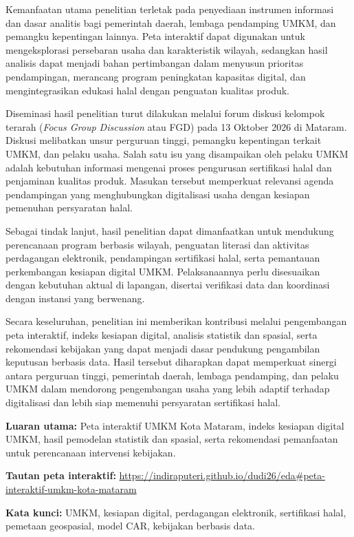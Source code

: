 \documentclass[
  indonesian,
  11pt,
  a4paper,
]{report}
\begin{document}
Kemanfaatan utama penelitian terletak pada penyediaan instrumen
informasi dan dasar analitis bagi pemerintah daerah, lembaga pendamping
UMKM, dan pemangku kepentingan lainnya. Peta interaktif dapat digunakan
untuk mengeksplorasi persebaran usaha dan karakteristik wilayah,
sedangkan hasil analisis dapat menjadi bahan pertimbangan dalam menyusun
prioritas pendampingan, merancang program peningkatan kapasitas digital,
dan mengintegrasikan edukasi halal dengan penguatan kualitas produk.

Diseminasi hasil penelitian turut dilakukan melalui forum diskusi
kelompok terarah (\emph{Focus Group Discussion} atau FGD) pada 13
Oktober 2026 di Mataram. Diskusi melibatkan unsur perguruan tinggi,
pemangku kepentingan terkait UMKM, dan pelaku usaha. Salah satu isu yang
disampaikan oleh pelaku UMKM adalah kebutuhan informasi mengenai proses
pengurusan sertifikasi halal dan penjaminan kualitas produk. Masukan
tersebut memperkuat relevansi agenda pendampingan yang menghubungkan
digitalisasi usaha dengan kesiapan pemenuhan persyaratan halal.

Sebagai tindak lanjut, hasil penelitian dapat dimanfaatkan untuk
mendukung perencanaan program berbasis wilayah, penguatan literasi dan
aktivitas perdagangan elektronik, pendampingan sertifikasi halal, serta
pemantauan perkembangan kesiapan digital UMKM. Pelaksanaannya perlu
disesuaikan dengan kebutuhan aktual di lapangan, disertai verifikasi
data dan koordinasi dengan instansi yang berwenang.

Secara keseluruhan, penelitian ini memberikan kontribusi melalui
pengembangan peta interaktif, indeks kesiapan digital, analisis
statistik dan spasial, serta rekomendasi kebijakan yang dapat menjadi
dasar pendukung pengambilan keputusan berbasis data. Hasil tersebut
diharapkan dapat memperkuat sinergi antara perguruan tinggi, pemerintah
daerah, lembaga pendamping, dan pelaku UMKM dalam mendorong pengembangan
usaha yang lebih adaptif terhadap digitalisasi dan lebih siap memenuhi
persyaratan sertifikasi halal.

\textbf{Luaran utama:} Peta interaktif UMKM Kota Mataram, indeks
kesiapan digital UMKM, hasil pemodelan statistik dan spasial, serta
rekomendasi pemanfaatan untuk perencanaan intervensi kebijakan.

\textbf{Tautan peta interaktif:}
\url{https://indiraputeri.github.io/dudi26/eda\#peta-interaktif-umkm-kota-mataram}

\textbf{Kata kunci:} UMKM, kesiapan digital, perdagangan elektronik,
sertifikasi halal, pemetaan geospasial, model CAR, kebijakan berbasis
data.
\end{document}
